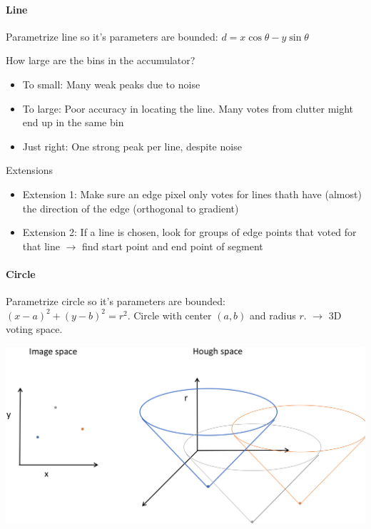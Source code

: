 \paragraph{Line}
Parametrize line so it's parameters are bounded: $d = x\cos\theta - y\sin\theta$

How large are the bins in the accumulator?
\begin{itemize}
    \item To small: Many weak peaks due to noise
    \item To large: Poor accuracy in locating the line. Many votes from clutter might end up in the same bin
    \item Just right: One strong peak per line, despite noise
\end{itemize}
Extensions
\begin{itemize}
    \item Extension 1: Make sure an edge pixel only votes for lines thath have (almost) the direction of the edge (orthogonal to gradient)
    \item Extension 2: If a line is chosen, look for groups of edge points that voted for that line $\rightarrow$ find start point and end point of segment
\end{itemize}

\paragraph{Circle}
\begin{minipage}{0.48\textwidth}
    Parametrize circle so it's parameters are bounded:\\ $(x-a)^2 + (y-b)^2 = r^2$.
    Circle with center $(a,b)$ and radius $r$. $\rightarrow$ 3D voting space.

    
\end{minipage}
\begin{minipage}{0.52\textwidth}
    \includegraphics[width=1\textwidth]{sections/ModelFitting/img/circle_space.png}
\end{minipage}